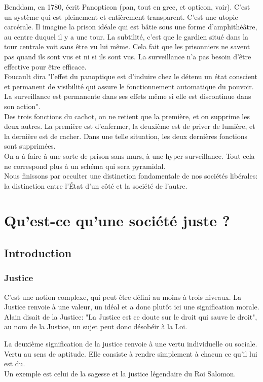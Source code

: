 \documentclass[10pt, a4paper, openany]{book}
\begin{document}
Benddam, en 1780, écrit Panopticon (pan, tout en grec, et opticon, voir). C'est un système qui est pleinement et entièrement transparent. C'est une utopie carcérale. Il imagine la prison idéale qui est bâtie sous une forme d'amphithéâtre, au centre duquel il y a une tour. La subtilité, c'est que le gardien situé dans la tour centrale voit sans être vu lui même. Cela fait que les prisonniers ne savent pas quand ils sont vus et ni si ils sont vus. La surveillance n'a pas besoin d'être effective pour être efficace. \\
Foucault dira "l'effet du panoptique est d'induire chez le détenu un état conscient et permanent de visibilité qui assure le fonctionnement automatique du pouvoir. La surveillance est permanente dans ses effets même si elle est discontinue dans son action". \\
Des trois fonctions du cachot, on ne retient que la première, et on supprime les deux autres. La première est d'enfermer, la deuxième est de priver de lumière, et la dernière est de cacher. Dans une telle situation, les deux dernières fonctions sont supprimées. \\
On a à faire à une sorte de prison sans murs, à une hyper-surveillance. Tout cela ne correspond plus à un schéma qui sera pyramidal. \\
Nous finissons par occulter une distinction fondamentale de nos sociétés libérales: la distinction entre l'État d'un côté et la société de l'autre. 


\chapter{Qu'est-ce qu'une société juste ?}

\section{Introduction}

\subsection{Justice}

C'est une notion complexe, qui peut être défini au moins à trois niveaux. La Justice renvoie à une valeur, un idéal et a donc plutôt ici une signification morale. Alain disait de la Justice: "La Justice est ce doute sur le droit qui sauve le droit", au nom de la Justice, un sujet peut donc désobéir à la Loi.


La deuxième signification de la justice renvoie à une vertu individuelle ou sociale. Vertu au sens de aptitude. Elle consiste à rendre simplement à chacun ce qu'il lui est du. \\
Un exemple est celui de la sagesse et la justice légendaire du Roi Salomon. 
\end{document}
